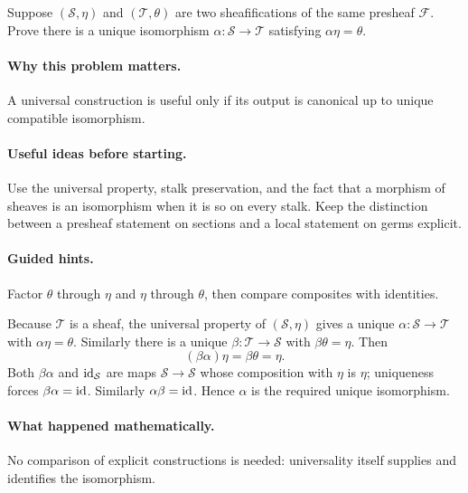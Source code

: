 \begin{problem}
Suppose $(\mathcal S,\eta)$ and $(\mathcal T,\theta)$ are two sheafifications of the same presheaf $\mathcal F$. Prove there is a unique isomorphism $\alpha:\mathcal S\to\mathcal T$ satisfying $\alpha\eta=\theta$.
\end{problem}

\paragraph{Why this problem matters.}
A universal construction is useful only if its output is canonical up to unique compatible isomorphism.

\paragraph{Useful ideas before starting.}
Use the universal property, stalk preservation, and the fact that a morphism of sheaves is an isomorphism when it is so on every stalk.  Keep the distinction between a presheaf statement on sections and a local statement on germs explicit.

\paragraph{Guided hints.}
Factor $\theta$ through $\eta$ and $\eta$ through $\theta$, then compare composites with identities.

\ifdefined\FullProblemDossiers
\begin{solution}
Because $\mathcal T$ is a sheaf, the universal property of $(\mathcal S,\eta)$ gives a unique $\alpha:\mathcal S\to\mathcal T$ with $\alpha\eta=\theta$. Similarly there is a unique $\beta:\mathcal T\to\mathcal S$ with $\beta\theta=\eta$. Then
\[
(\beta\alpha)\eta=\beta\theta=\eta.
\]
Both $\beta\alpha$ and $\operatorname{id}_{\mathcal S}$ are maps $\mathcal S\to\mathcal S$ whose composition with $\eta$ is $\eta$; uniqueness forces $\beta\alpha=\operatorname{id}$. Similarly $\alpha\beta=\operatorname{id}$. Hence $\alpha$ is the required unique isomorphism.
\end{solution}

\paragraph{What happened mathematically.}
No comparison of explicit constructions is needed: universality itself supplies and identifies the isomorphism.

